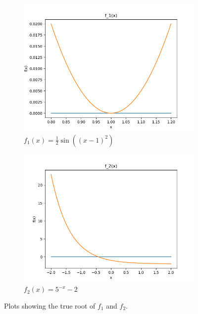 \documentclass[a4paper,12pt]{article}
\begin{document}
\begin{figure}[H]
    \centering
	\begin{subfigure}[b]{0.49\textwidth}
	    \centering
	    \includegraphics[width=\textwidth]{img/report1/f1.png}
	    \caption{$f_1(x) = \frac{1}{2}\sin((x - 1)^2)$}
	    \label{fig:0}
	\end{subfigure}
	\hfill
	\begin{subfigure}[b]{0.49\textwidth}
	    \centering
	     \includegraphics[width=\textwidth]{img/report1/f2.png}
	     \caption{$f_2(x) = 5^{-x} - 2$}
	     \label{fig:1}
	\end{subfigure}
	\caption{Plots showing the true root of $f_1$ and $f_2$.}
\end{figure}
\end{document}

